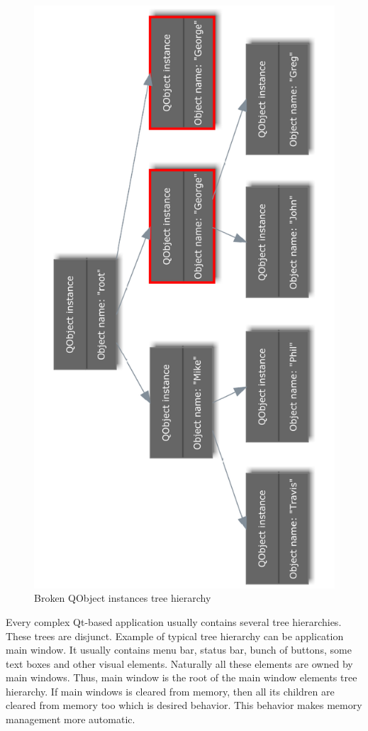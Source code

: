 \begin{figure}[ht]
\centering
\includegraphics[angle=-90,width=13cm]{graphics/laboratory/13-samenames.pdf}
\caption{Broken QObject instances tree hierarchy}\label{figure:samenames}
\end{figure}

Every complex Qt-based application usually contains several tree hierarchies. These trees are disjunct. Example of typical tree hierarchy can be application main window. It usually contains menu bar, status bar, bunch of buttons, some text boxes and other visual elements. Naturally all these elements are owned by main windows. Thus, main window is the root of the main window elements tree hierarchy. If main windows is cleared from memory, then all its children are cleared from memory too which is desired behavior. This behavior makes memory management more automatic.

